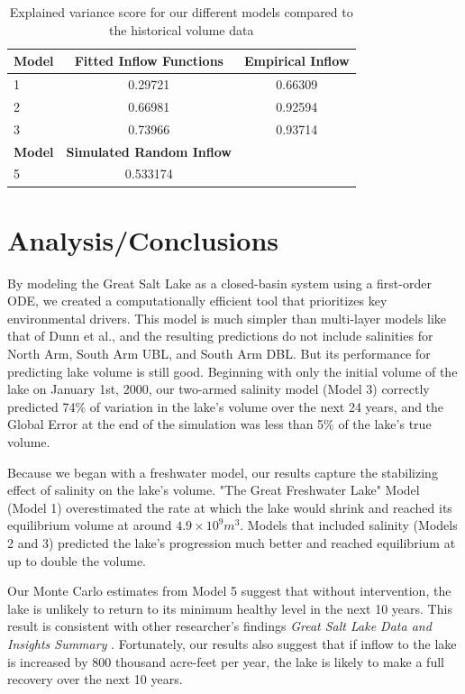 \documentclass[12pt]{article}
\begin{document}
\begin{table}[h]
\centering
\begin{tabular}{lcc}
\hline
\textbf{Model} & \textbf{Fitted Inflow Functions} & \textbf{Empirical Inflow} \\
\hline
1    & 0.29721 & 0.66309 \\
2    & 0.66981 & 0.92594 \\
3    & 0.73966 & 0.93714 \\
\hline
\textbf{Model} & \textbf{Simulated Random Inflow} \\
\hline
5    & 0.533174 \\
\hline
\end{tabular}
\caption{Explained variance score for our different models compared to the historical volume data}
\label{tab:explained_var}
\end{table}

\section{Analysis/Conclusions}

By modeling the Great Salt Lake as a closed-basin system using a first-order ODE, we created a computationally efficient tool that prioritizes key environmental drivers. This model is much simpler than multi-layer models like that of Dunn et al.\cite{Dunn2025}, and the resulting predictions do not include salinities for North Arm, South Arm UBL, and South Arm DBL. But its performance for predicting lake volume is still good. Beginning with only the initial volume of the lake on January 1st, 2000, our two-armed salinity model (Model 3) correctly predicted 74\% of variation in the lake's volume over the next 24 years, and the Global Error at the end of the simulation was less than 5\% of the lake's true volume. 

Because we began with a freshwater model, our results capture the stabilizing effect of salinity on the lake's volume. "The Great Freshwater Lake" Model (Model 1) overestimated the rate at which the lake would shrink and reached its equilibrium volume at around $4.9\times 10^{9} m^{3}$. Models that included salinity (Models 2 and 3) predicted the lake's progression much better and reached equilibrium at up to double the volume.

Our Monte Carlo estimates from Model 5 suggest that without intervention, the lake is unlikely to return to its minimum healthy level in the next 10 years. This result is consistent with other researcher's findings \textit{Great Salt Lake Data and Insights Summary} \cite{GSLStrikeTeam2026}. Fortunately, our results also suggest that if inflow to the lake is increased by 800 thousand acre-feet per year, the lake is likely to make a full recovery over the next 10 years. 
\end{document}
